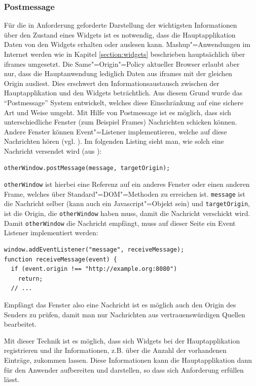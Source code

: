 \subsubsection*{Postmessage}
Für die in Anforderung  geforderte Darstellung der wichtigsten Informationen über den Zustand eines Widgets ist es notwendig, dass die Hauptapplikation Daten von den Widgets erhalten oder auslesen kann. Mashup"=Anwendungen im Internet werden wie in Kapitel \ref{section:widgets} beschrieben hauptsächlich über iframes umgesetzt. Die Same"=Origin"=Policy aktueller Browser erlaubt aber nur, dass die Hauptanwendung lediglich Daten aus iframes mit der gleichen Origin ausliest. Dies erschwert den Informationsaustausch zwischen der Hauptapplikation und den Widgets beträchtlich. Aus diesem Grund wurde das "`Postmessage"' System entwickelt, welches diese Einschränkung auf eine sichere Art und Weise umgeht. Mit Hilfe von Postmessage ist es möglich, dass sich unterschiedliche Fenster (zum Beispiel Frames) Nachrichten schicken können. Andere Fenster können Event"=Listener implementieren, welche auf diese Nachrichten hören (vgl. \cite{MDN2012}). Im folgenden Listing sieht man, wie solch eine Nachricht versendet wird (aus \cite{MDN2012}):
\begin{lstlisting}
otherWindow.postMessage(message, targetOrigin);
\end{lstlisting}
\texttt{otherWindow} ist hierbei eine Referenz auf ein anderes Fenster oder einen anderen Frame, welches über Standard"=DOM"=Methoden zu erreichen ist. \texttt{message} ist die Nachricht selber (kann auch ein Javascript"=Objekt sein) und \texttt{targetOrigin}, ist die Origin, die \texttt{otherWindow} haben muss, damit die Nachricht verschickt wird. Damit \texttt{otherWindow} die Nachricht empfängt, muss auf dieser Seite ein Event Listener implementiert werden:
\begin{lstlisting}
window.addEventListener("message", receiveMessage);
function receiveMessage(event) {
  if (event.origin !== "http://example.org:8080")
    return;
  // ...
\end{lstlisting}
Empfängt das Fenster also eine Nachricht ist es möglich auch den Origin des Senders zu prüfen, damit man nur Nachrichten aus vertrauenswürdigen Quellen bearbeitet.

Mit dieser Technik ist es möglich, dass sich Widgets bei der Hauptapplikation registrieren und ihr Informationen, z.B. über die Anzahl der vorhandenen Einträge, zukommen lassen. Diese Informationen kann die Hauptapplikation dann für den Anwender aufbereiten und darstellen, so dass sich Anforderung  erfüllen lässt.

